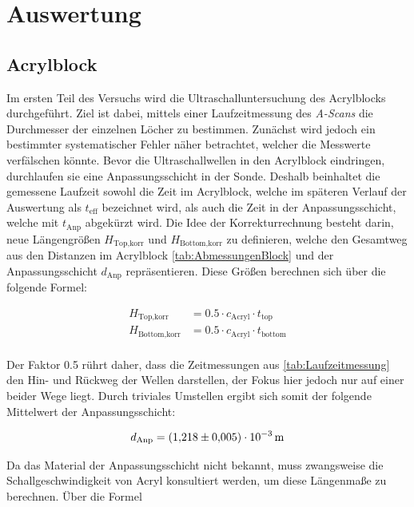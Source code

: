 \section{Auswertung}
\label{sec:Auswertung}

\subsection{Acrylblock}

\noindent Im ersten Teil des Versuchs wird die Ultraschalluntersuchung des Acrylblocks durchgeführt. Ziel ist dabei, mittels 
einer Laufzeitmessung des \emph{A-Scans} die Durchmesser der einzelnen Löcher zu bestimmen. Zunächst wird jedoch ein bestimmter 
systematischer Fehler näher betrachtet, welcher die Messwerte verfälschen könnte. Bevor die Ultraschallwellen in den Acrylblock 
eindringen, durchlaufen sie eine Anpassungsschicht in der Sonde. Deshalb beinhaltet die gemessene Laufzeit sowohl die Zeit im 
Acrylblock, welche im späteren Verlauf der Auswertung als $t_\text{eff}$ bezeichnet wird, als auch die Zeit in der Anpassungsschicht,
welche mit $t_\text{Anp}$ abgekürzt wird. Die Idee der Korrekturrechnung besteht darin, neue Längengrößen $H_\text{Top,korr}$ und $H_\text{Bottom,korr}$
zu definieren, welche den Gesamtweg aus den Distanzen im Acrylblock \ref{tab:AbmessungenBlock} und der Anpassungsschicht $d_\text{Anp}$
repräsentieren. Diese Größen berechnen sich über die folgende Formel:

\begin{align*}
    H_\text{Top,korr} &= 0.5 \cdot c_\text{Acryl} \cdot t_\text{top}\\
    H_\text{Bottom,korr} &= 0.5 \cdot c_\text{Acryl} \cdot t_\text{bottom}\\
\end{align*}

\noindent Der Faktor 0.5 rührt daher, dass die Zeitmessungen aus \ref{tab:Laufzeitmessung} den Hin- und Rückweg der Wellen darstellen,
der Fokus hier jedoch nur auf einer beider Wege liegt. Durch triviales Umstellen ergibt sich somit der folgende Mittelwert der 
Anpassungsschicht:

\begin{equation*}
    d_\text{Anp} = \qty{1.218\pm0.005e-3}{\meter}
\end{equation*}

\noindent Da das Material der Anpassungsschicht nicht bekannt, muss zwangsweise die Schallgeschwindigkeit von Acryl konsultiert 
werden, um diese Längenmaße zu berechnen. Über die Formel 

